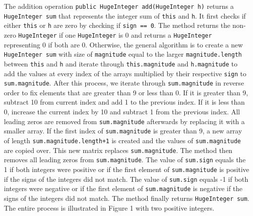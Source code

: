 \documentclass[12pt]{article}
\newcommand{\code}[1]{\texttt{#1}}
\begin{document}
The addition operation \code{public HugeInteger add(HugeInteger h)} returns a \code{HugeInteger sum} that represents the integer sum of \code{this} and \code{h}. It first checks if either \code{this} or \code{h} are zero by checking if \code{sign == 0}. The method returns the non-zero \code{HugeInteger} if one \code{HugeInteger} is 0 and returns a \code{HugeInteger} representing 0 if both are 0. Otherwise, the general algorithm is to create a new \code{HugeInteger sum} with size of \code{magnitude} equal to the larger \code{magnitude.length} between \code{this} and \code{h} and iterate through \code{this.magnitude} and \code{h.magnitude} to add the values at every index of the arrays multiplied by their respective \code{sign} to \code{sum.magnitude}. After this process, we iterate through \code{sum.magnitude} in reverse order to fix elements that are greater than 9 or less than 0. If it is greater than 9, subtract 10 from current index and add 1 to the previous index. If it is less than 0, increase the current index by 10 and subtract 1 from the previous index. All leading zeros are removed from \code{sum.magnitude} afterwards by replacing it with a smaller array. If the first index of \code{sum.magnitude} is greater than 9, a new array of length \code{sum.magnitude.length+1} is created and the values of \code{sum.magnitude} are copied over. This new matrix replaces \code{sum.magnitude}. The method then removes all leading zeros from \code{sum.magnitude}. The value of \code{sum.sign} equals the 1 if both integers were positive or if the first element of \code{sum.magnitude} is positive if the signs of the integers did not match. The value of \code{sum.sign} equals -1 if both integers were negative or if the first element of \code{sum.magnitude} is negative if the signs of the integers did not match. The method finally returns \code{HugeInteger sum}. The entire process is illustrated in Figure 1 with two positive integers.
\end{document}
